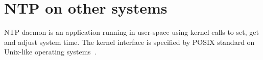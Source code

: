 
\chapter{NTP on other systems}
NTP daemon is an application running in user-space using kernel calls to set, get and
adjust system time.
The kernel interface is specified by POSIX standard on Unix-like operating systems~\cite{posix}.





